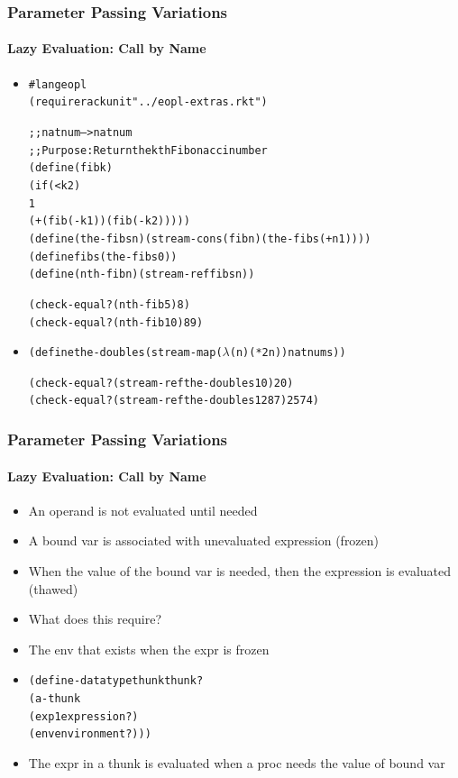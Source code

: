 \documentclass{beamer}
\begin{document}
\begin{frame}[fragile]
\frametitle{Parameter Passing Variations}
\framesubtitle{Lazy Evaluation: Call by Name}
\begin{scriptsize}
\begin{itemize}
\item<1->
\begin{alltt}
#lang eopl
(require rackunit "../eopl-extras.rkt")

;; natnum --> natnum
;; Purpose: Return the kth Fibonacci number
(define (fib k)
  (if (< k 2)
      1
      (+ (fib (- k 1)) (fib (- k 2)))))
(define (the-fibs n) (stream-cons (fib n) (the-fibs (+ n 1))))
(define fibs (the-fibs 0))
(define (nth-fib n) (stream-ref fibs n))

(check-equal?  (nth-fib 5)  8)
(check-equal?  (nth-fib 10) 89)
\end{alltt}

\item<2->
\begin{alltt}
(define the-doubles (stream-map (\(\lambda\) (n) (* 2 n)) natnums))

(check-equal? (stream-ref the-doubles 10) 20)
(check-equal? (stream-ref the-doubles 1287) 2574)
\end{alltt}

\end{itemize}
\end{scriptsize}
\end{frame}

\begin{frame}[fragile]
\frametitle{Parameter Passing Variations}
\framesubtitle{Lazy Evaluation: Call by Name}
\begin{scriptsize}
\begin{itemize}
\item<1-> An operand is not evaluated until needed

\item<2-> A bound var is associated with unevaluated  expression (frozen)

\item<3-> When the value of the bound var is needed, then the expression is evaluated (thawed)

\item<4-> What does this require?

\item<5-> The env that exists when the expr is frozen

\item<6->
\begin{alltt}
(define-datatype thunk thunk?
  (a-thunk
    (exp1 expression?)
    (env environment?)))
\end{alltt}

\item<6-> The expr in a thunk is evaluated when a proc needs the value of bound var


\end{itemize}
\end{scriptsize}
\end{frame}
\end{document}
